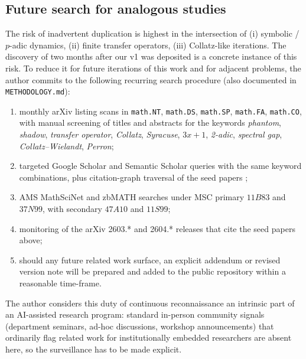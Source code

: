 \documentclass[11pt,a4paper]{article}
\theoremstyle{definition}
\begin{document}
\subsection{Future search for analogous studies}
\label{sec:methodology-future-search}

The risk of inadvertent duplication is highest in the
intersection of (i) symbolic / $p$-adic dynamics, (ii) finite
transfer operators, (iii) Collatz-like iterations. The discovery
of \cite{chang2026} two months after our v1 was deposited is a
concrete instance of this risk. To reduce it for future iterations
of this work and for adjacent problems, the author commits to the
following recurring search procedure (also documented in
\texttt{METHODOLOGY.md}):
\begin{enumerate}
  \item monthly arXiv listing scans in \texttt{math.NT},
        \texttt{math.DS}, \texttt{math.SP}, \texttt{math.FA},
        \texttt{math.CO}, with manual screening of titles and
        abstracts for the keywords \emph{phantom}, \emph{shadow},
        \emph{transfer operator}, \emph{Collatz}, \emph{Syracuse},
        \emph{$3x+1$}, \emph{2-adic}, \emph{spectral gap},
        \emph{Collatz--Wielandt}, \emph{Perron};
  \item targeted Google Scholar and Semantic Scholar queries with
        the same keyword combinations, plus citation-graph
        traversal of the seed papers \cite{chang2026,
        siegel2023a, rozier2025, neklyudov2022,
        leventides2020, lemmensnussbaum};
  \item AMS MathSciNet and zbMATH searches under MSC primary
        $11B83$ and $37N99$, with secondary $47A10$ and $11S99$;
  \item monitoring of the arXiv 2603.* and 2604.* releases that
        cite the seed papers above;
  \item should any future related work surface, an explicit
        addendum or revised version note will be prepared and
        added to the public repository within a reasonable
        time-frame.
\end{enumerate}
The author considers this duty of continuous reconnaissance an
intrinsic part of an AI-assisted research program: standard
in-person community signals (department seminars, ad-hoc
discussions, workshop announcements) that ordinarily flag related
work for institutionally embedded researchers are absent here, so
the surveillance has to be made explicit.
\end{document}
